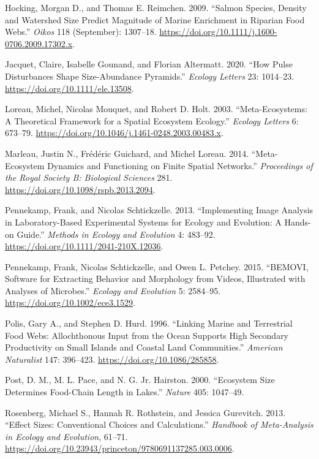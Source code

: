 \documentclass[
]{article}
\newlength{\cslhangindent}
\newlength{\cslentryspacingunit} %
\newenvironment{CSLReferences}[2] %
 {%
  \setlength{\parindent}{0pt}
  \ifodd #1
  \let\oldpar\par
  \def\par{\hangindent=\cslhangindent\oldpar}
  \fi
  \setlength{\parskip}{#2\cslentryspacingunit}
 }%
 {}
\begin{document}
\begin{CSLReferences}{1}{0}
\leavevmode{}%
Hocking, Morgan D., and Thomas E. Reimchen. 2009. {``Salmon Species,
Density and Watershed Size Predict Magnitude of Marine Enrichment in
Riparian Food Webs.''} \emph{Oikos} 118 (September): 1307--18.
\url{https://doi.org/10.1111/j.1600-0706.2009.17302.x}.

\leavevmode{}%
Jacquet, Claire, Isabelle Gounand, and Florian Altermatt. 2020. {``How
Pulse Disturbances Shape Size-Abundance Pyramids.''} \emph{Ecology
Letters} 23: 1014--23. \url{https://doi.org/10.1111/ele.13508}.

\leavevmode{}%
Loreau, Michel, Nicolas Mouquet, and Robert D. Holt. 2003.
{``Meta-Ecosystems: A Theoretical Framework for a Spatial Ecosystem
Ecology.''} \emph{Ecology Letters} 6: 673--79.
\url{https://doi.org/10.1046/j.1461-0248.2003.00483.x}.

\leavevmode{}%
Marleau, Justin N., Frédéric Guichard, and Michel Loreau. 2014.
{``Meta-Ecosystem Dynamics and Functioning on Finite Spatial
Networks.''} \emph{Proceedings of the Royal Society B: Biological
Sciences} 281. \url{https://doi.org/10.1098/rspb.2013.2094}.

\leavevmode{}%
Pennekamp, Frank, and Nicolas Schtickzelle. 2013. {``Implementing Image
Analysis in Laboratory-Based Experimental Systems for Ecology and
Evolution: A Hands-on Guide.''} \emph{Methods in Ecology and Evolution}
4: 483--92. \url{https://doi.org/10.1111/2041-210X.12036}.

\leavevmode{}%
Pennekamp, Frank, Nicolas Schtickzelle, and Owen L. Petchey. 2015.
{``BEMOVI, Software for Extracting Behavior and Morphology from Videos,
Illustrated with Analyses of Microbes.''} \emph{Ecology and Evolution}
5: 2584--95. \url{https://doi.org/10.1002/ece3.1529}.

\leavevmode{}%
Polis, Gary A., and Stephen D. Hurd. 1996. {``Linking Marine and
Terrestrial Food Webs: Allochthonous Input from the Ocean Supports High
Secondary Productivity on Small Islands and Coastal Land Communities.''}
\emph{American Naturalist} 147: 396--423.
\url{https://doi.org/10.1086/285858}.

\leavevmode{}%
Post, D. M., M. L. Pace, and N. G. Jr. Hairston. 2000. {``Ecosystem Size
Determines Food-Chain Length in Lakes.''} \emph{Nature} 405: 1047--49.

\leavevmode{}%
Rosenberg, Michael S., Hannah R. Rothstein, and Jessica Gurevitch. 2013.
{``Effect Sizes: Conventional Choices and Calculations.''}
\emph{Handbook of Meta-Analysis in Ecology and Evolution}, 61--71.
\url{https://doi.org/10.23943/princeton/9780691137285.003.0006}.

\end{CSLReferences}
\end{document}
